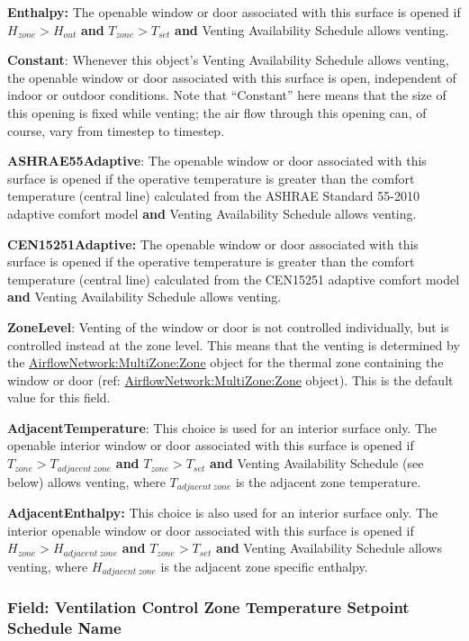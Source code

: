 \textbf{Enthalpy:} The openable window or door associated with this surface is
opened if $H_{zone} > H_{out}$ \textbf{and} $T_{zone} > T_{set}$ \textbf{and}
Venting Availability Schedule allows venting.

\textbf{Constant}: Whenever this object's Venting Availability Schedule allows venting, the openable window or door associated with this surface is open, independent of indoor or outdoor conditions. Note that ``Constant'' here means that the size of this opening is fixed while venting; the air flow through this opening can, of course, vary from timestep to timestep.

\textbf{ASHRAE55Adaptive}: The openable window or door associated with this surface is opened if the operative temperature is greater than the comfort temperature (central line) calculated from the ASHRAE Standard 55-2010 adaptive comfort model \textbf{and} Venting Availability Schedule allows venting.

\textbf{CEN15251Adaptive:} The openable window or door associated with this surface is opened if the operative temperature is greater than the comfort temperature (central line) calculated from the CEN15251 adaptive comfort model \textbf{and} Venting Availability Schedule allows venting.

\textbf{ZoneLevel}: Venting of the window or door is not controlled individually, but is controlled instead at the zone level. This means that the venting is determined by the \hyperref[airflownetworkmultizonezone]{AirflowNetwork:MultiZone:Zone} object for the thermal zone containing the window or door (ref: \hyperref[airflownetworkmultizonezone]{AirflowNetwork:MultiZone:Zone} object). This is the default value for this field.

\textbf{AdjacentTemperature}: This choice is used for an interior surface only.
The openable interior window or door associated with this surface is opened if
$T_{zone} > T_{adjacent\ zone}$ \textbf{and} $T_{zone} > T_{set}$ \textbf{and}
Venting Availability Schedule (see below) allows venting, where $T_{adjacent\ zone}$
is the adjacent zone temperature.

\textbf{AdjacentEnthalpy:} This choice is also used for an interior surface only.
The interior openable window or door associated with this surface is opened if
$H_{zone} > H_{adjacent\ zone}$ \textbf{and} $T_{zone} > T_{set}$ \textbf{and}
Venting Availability Schedule allows venting, where $H_{adjacent\ zone}$ is the
adjacent zone specific enthalpy.

\subsubsection{Field: Ventilation Control Zone Temperature Setpoint Schedule Name}\label{field-ventilation-control-zone-temperature-setpoint-schedule-name-1}

